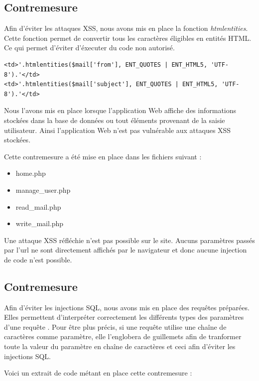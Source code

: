 \documentclass[12pt]{article}
\begin{document}
\newpage
\subsection{Contremesure}\label{c2}

Afin d'éviter les attaques XSS, nous avons mis en place la fonction \textit{htmlentities}. Cette fonction permet de convertir tous les caractères éligibles en entités HTML. Ce qui permet d'éviter d'éxecuter du code non autorisé.

\begin{lstlisting}[style=JAVA]
<td>'.htmlentities($mail['from'], ENT_QUOTES | ENT_HTML5, 'UTF-8').'</td>
<td>'.htmlentities($mail['subject'], ENT_QUOTES | ENT_HTML5, 'UTF-8').'</td>
\end{lstlisting}

Nous l'avons mis en place lorsque l'application Web affiche des informations stockées dans la base de données ou tout éléments provenant de la saisie utilisateur. Ainsi l'application Web n'est pas vulnérable aux attaques XSS stockées.

Cette contremesure a été mise en place dans les fichiers suivant :

\begin{itemize}
\item home.php
\item manage\_user.php
\item read\_mail.php
\item write\_mail.php
\end{itemize}

Une attaque XSS réfléchie n'est pas possible sur le site. Aucuns paramètres passés par l'url ne sont directement affichés par le navigateur et donc aucune injection de code n'est possible.

\newpage
\subsection{Contremesure}\label{c3}

Afin d'éviter les injections SQL, nous avons mis en place des requêtes préparées. Elles permettent d'interpréter correctement les différents types des paramètres d'une requête . Pour être plus précis, si une requête utilise une chaîne de caractères comme paramètre, elle l'englobera de guillemets afin de tranformer toute la valeur du paramètre en chaîne de caractères et ceci afin d'éviter les injections SQL.

Voici un extrait de code métant en place cette contremesure : 
\end{document}
